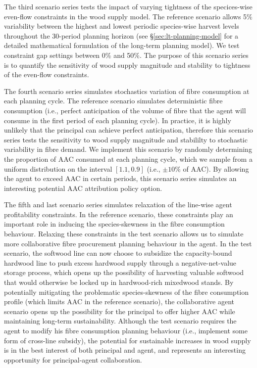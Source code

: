 The third scenario series tests the impact of varying tightness of the specices-wise even-flow constraints in the wood supply model. The reference scenario allows 5\% variability between the highest and lowest periodic species-wise harvest levels throughout the 30-period planning horizon (see \S\ref{sec:lt-planning-model} for a detailed mathematical formulation of the long-term planning model). We test constraint gap settings between 0\% and 50\%. The purpose of this scenario series is to quantify the sensitivity of wood supply magnitude and stability to tightness of the even-flow constraints.

The fourth scenario series simulates stochastics variation of fibre consumption at each planning cycle. The reference scenario simulates deterministic fibre consumption (i.e., perfect anticipation of the volume of fibre that the agent will consume in the first period of each planning cycle). In practice, it is highly unlikely that the principal can achieve perfect anticipation, therefore this scenario series tests the sensitivity to wood supply magnitude and stabililty to stochastic variability in fibre demand. We implement this scenario by randomly determining the proportion of AAC consumed at each planning cycle, which we sample from a uniform distribution on the interval $[1.1, 0.9]$ (i.e., $\pm 10\%$ of AAC). By allowing the agent to exceed AAC in certain periods, this scenario series simulates an interesting potential AAC attribution policy option.

The fifth and last scenario series simulates relaxation of the line-wise agent profitability constraints. In the reference scenario, these constraints play an important role in inducing the species-skewness in the fibre consumption behaviour. Relaxing these constraints in the test scenario allows us to simulate more collaborative fibre procurement planning behaviour in the agent. In the test scenario, the softwood line can now choose to subsidize the capacity-bound hardwood line to push excess hardwood supply through a negative-net-value storage process, which opens up the possibility of harvesting valuable softwood that would otherwise be locked up in hardwood-rich mixedwood stands. By potentially mitigating the problematic species-skewness of the fibre consumption profile (which limits AAC in the reference scenario), the collaborative agent scenario opens up the possibility for the principal to offer higher AAC while maintaining long-term sustainability. Although the test scenario requires the agent to modify his fibre consumption planning behaviour (i.e., implement some form of cross-line subsidy), the potential for sustainable increases in wood supply is in the best interest of both principal and agent, and represents an interesting opportunity for principal-agent collaboration.

